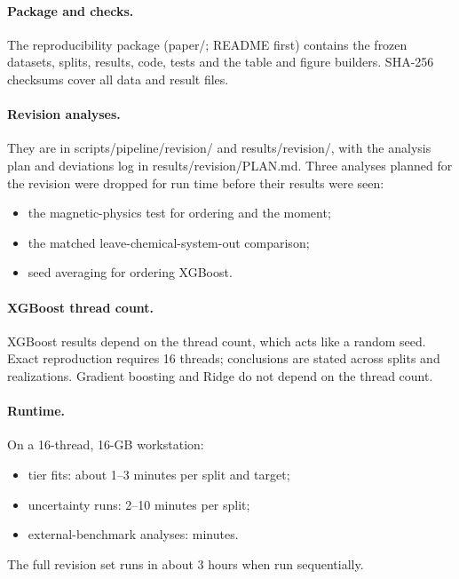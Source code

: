 \documentclass[11pt,a4paper]{article}
\begin{document}
\paragraph{Package and checks.} The reproducibility package (paper/; README first) contains the frozen datasets, splits, results, code, tests and the table and figure builders. SHA-256 checksums cover all data and result files.

\paragraph{Revision analyses.} They are in scripts/pipeline/revision/ and results/revision/, with the analysis plan and deviations log in results/revision/PLAN.md. Three analyses planned for the revision were dropped for run time before their results were seen:
\begin{itemize}
\item the magnetic-physics test for ordering and the moment;
\item the matched leave-chemical-system-out comparison;
\item seed averaging for ordering XGBoost.
\end{itemize}

\paragraph{XGBoost thread count.} XGBoost results depend on the thread count, which acts like a random seed. Exact reproduction requires 16 threads; conclusions are stated across splits and realizations. Gradient boosting and Ridge do not depend on the thread count.

\paragraph{Runtime.} On a 16-thread, 16-GB workstation:
\begin{itemize}
\item tier fits: about 1--3 minutes per split and target;
\item uncertainty runs: 2--10 minutes per split;
\item external-benchmark analyses: minutes.
\end{itemize}
The full revision set runs in about 3 hours when run sequentially.

{\singlespacing

}
\end{document}
